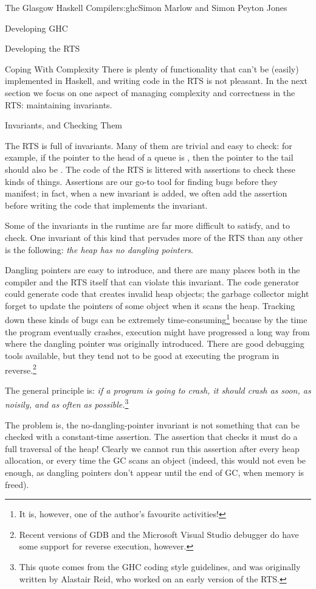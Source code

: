 \begin{aosachapter}{The Glasgow Haskell Compiler}{s:ghc}{Simon Marlow and Simon Peyton Jones}
\begin{aosasect1}{Developing GHC}
\begin{aosasect2}{Developing the RTS}
\begin{aosasect3}{Coping With Complexity}
There is plenty of functionality that can't be (easily) implemented in
Haskell, and writing code in the RTS is not pleasant.  In the next
section we focus on one aspect of managing complexity and correctness
in the RTS: maintaining invariants.

\end{aosasect3}

\end{aosasect2}

\begin{aosasect2}{Invariants, and Checking Them}

The RTS is full of invariants.  Many of them are trivial and easy to
check: for example, if the pointer to the head of a queue is
, then the pointer to the tail should also be .
The code of the RTS is littered with assertions to check these kinds
of things.  Assertions are our go-to tool for finding bugs before they
manifest; in fact, when a new invariant is added, we often add the
assertion before writing the code that implements the invariant.

Some of the invariants in the runtime are far more difficult to
satisfy, and to check.  One invariant of this kind that pervades more
of the RTS than any other is the following: \emph{the heap has no
  dangling pointers}.

Dangling pointers are easy to introduce, and there are many places
both in the compiler and the RTS itself that can violate this
invariant.  The code generator could generate code that creates
invalid heap objects; the garbage collector might forget to update the
pointers of some object when it scans the heap.  Tracking down these
kinds of bugs can be extremely time-consuming\footnote{It is, however,
  one of the author's favourite activities!} because by the time the
program eventually crashes, execution might have progressed a long way
from where the dangling pointer was originally introduced.  There are
good debugging tools available, but they tend not to be good at
executing the program in reverse.\footnote{Recent versions of GDB and
  the Microsoft Visual Studio debugger do have some support for
  reverse execution, however.}

The general principle is: \emph{if a program is going to crash, it
  should crash as soon, as noisily, and as often as
  possible.}\footnote{This quote comes from the GHC coding style
  guidelines, and was originally written by Alastair Reid, who worked
  on an early version of the RTS.}

The problem is, the no-dangling-pointer invariant is not something
that can be checked with a constant-time assertion.  The assertion
that checks it must do a full traversal of the heap!  Clearly we
cannot run this assertion after every heap allocation, or every time
the GC scans an object (indeed, this would not even be enough, as
dangling pointers don't appear until the end of GC, when memory is
freed).


\end{aosasect2}
\end{aosasect1}
\end{aosachapter}
